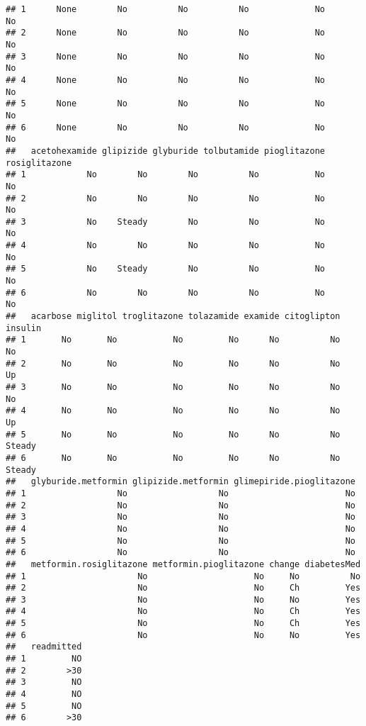 \documentclass[]{article}
\begin{document}
\begin{verbatim}
## 1      None        No          No          No             No          No
## 2      None        No          No          No             No          No
## 3      None        No          No          No             No          No
## 4      None        No          No          No             No          No
## 5      None        No          No          No             No          No
## 6      None        No          No          No             No          No
##   acetohexamide glipizide glyburide tolbutamide pioglitazone rosiglitazone
## 1            No        No        No          No           No            No
## 2            No        No        No          No           No            No
## 3            No    Steady        No          No           No            No
## 4            No        No        No          No           No            No
## 5            No    Steady        No          No           No            No
## 6            No        No        No          No           No            No
##   acarbose miglitol troglitazone tolazamide examide citoglipton insulin
## 1       No       No           No         No      No          No      No
## 2       No       No           No         No      No          No      Up
## 3       No       No           No         No      No          No      No
## 4       No       No           No         No      No          No      Up
## 5       No       No           No         No      No          No  Steady
## 6       No       No           No         No      No          No  Steady
##   glyburide.metformin glipizide.metformin glimepiride.pioglitazone
## 1                  No                  No                       No
## 2                  No                  No                       No
## 3                  No                  No                       No
## 4                  No                  No                       No
## 5                  No                  No                       No
## 6                  No                  No                       No
##   metformin.rosiglitazone metformin.pioglitazone change diabetesMed
## 1                      No                     No     No          No
## 2                      No                     No     Ch         Yes
## 3                      No                     No     No         Yes
## 4                      No                     No     Ch         Yes
## 5                      No                     No     Ch         Yes
## 6                      No                     No     No         Yes
##   readmitted
## 1         NO
## 2        >30
## 3         NO
## 4         NO
## 5         NO
## 6        >30
\end{verbatim}
\end{document}
